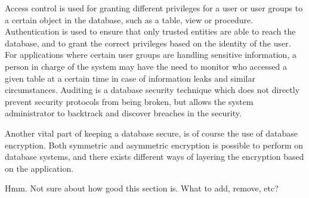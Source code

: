 Access control is used for granting different privileges for a user or user groups to a certain object in the database, such as a table, view or procedure. Authentication is used to ensure that only trusted entities are able to reach the database, and to grant the correct privileges based on the identity of the user. For applications where certain user groups are handling sensitive information, a person in charge of the system may have the need to monitor who accessed a given table at a certain time in case of information leaks and similar circumstances. Auditing is a database security technique which does not directly prevent security protocols from being broken, but allows the system administrator to backtrack and discover breaches in the security.

Another vital part of keeping a database secure, is of course the use of database encryption. Both symmetric and asymmetric encryption is possible to perform on database systems, and there exists different ways of layering the encryption based on the application.


Hmm. Not sure about how good this section is. What to add, remove, etc?